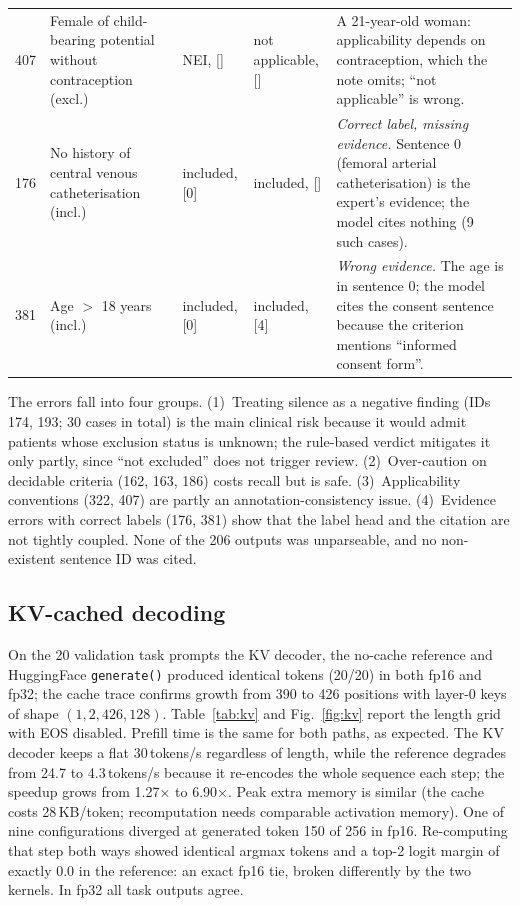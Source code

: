 \documentclass[conference]{IEEEtran}
\begin{document}
\begin{table}[t]
\begin{tabular}{@{}p{0.6cm}p{4.4cm}p{2.4cm}p{2.4cm}p{6.9cm}@{}}
407 & Female of child-bearing potential without contraception (excl.) & NEI, [] & not applicable, [] & A 21-year-old woman: applicability depends on contraception, which the note omits; ``not applicable'' is wrong. \\
176 & No history of central venous catheterisation (incl.) & included, [0] & included, [] & \emph{Correct label, missing evidence.} Sentence 0 (femoral arterial catheterisation) is the expert's evidence; the model cites nothing (9 such cases). \\
381 & Age $>$ 18 years (incl.) & included, [0] & included, [4] & \emph{Wrong evidence.} The age is in sentence 0; the model cites the consent sentence because the criterion mentions ``informed consent form''. \\
\bottomrule
\end{tabular}
\end{table}

The errors fall into four groups. (1)~Treating silence as a negative finding (IDs 174, 193; 30 cases in total) is the main clinical risk because it would admit patients whose exclusion status is unknown; the rule-based verdict mitigates it only partly, since ``not excluded'' does not trigger review. (2)~Over-caution on decidable criteria (162, 163, 186) costs recall but is safe. (3)~Applicability conventions (322, 407) are partly an annotation-consistency issue. (4)~Evidence errors with correct labels (176, 381) show that the label head and the citation are not tightly coupled. None of the 206 outputs was unparseable, and no non-existent sentence ID was cited.

\subsection{KV-cached decoding}
On the 20 validation task prompts the KV decoder, the no-cache reference and HuggingFace \texttt{generate()} produced identical tokens (20/20) in both fp16 and fp32; the cache trace confirms growth from 390 to 426 positions with layer-0 keys of shape $(1,2,426,128)$. Table~\ref{tab:kv} and Fig.~\ref{fig:kv} report the length grid with EOS disabled. Prefill time is the same for both paths, as expected. The KV decoder keeps a flat 30\,tokens/s regardless of length, while the reference degrades from 24.7 to 4.3\,tokens/s because it re-encodes the whole sequence each step; the speedup grows from 1.27$\times$ to 6.90$\times$. Peak extra memory is similar (the cache costs 28\,KB/token; recomputation needs comparable activation memory). One of nine configurations diverged at generated token 150 of 256 in fp16. Re-computing that step both ways showed identical argmax tokens and a top-2 logit margin of exactly 0.0 in the reference: an exact fp16 tie, broken differently by the two kernels. In fp32 all task outputs agree.
\end{document}
